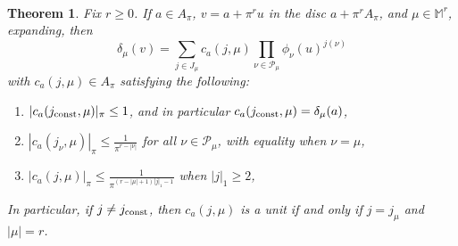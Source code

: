 \documentclass[10pt]{amsart}
\theoremstyle{Theorem}
\newtheorem{thm}{Theorem}[section]
\theoremstyle{definition}
\begin{document}
\






\begin{thm}\label{lma1} Fix $r \geq 0$. If $a \in A_{\pi}$, $v = a + \pi^r u$ in the disc $a+ \pi^r A_{\pi}$, and $\mu \in \mathbb{M}^r$, expanding, then $$\delta_{\mu}(v) = \sum_{j \in J_\mu} c_a(j,\mu) \prod_{\nu \in \mathcal{P}_\mu} \phi_\nu(u)^{j(\nu)}$$ with $c_a(j,\mu) \in A_\pi$ satisfying the following:
\begin{enumerate}
\item $|c_a(j_{\textup{const}},\mu)|_\pi \leq 1$, and in particular $c_a(j_\textup{const},\mu) = \delta_\mu(a)$,
\item $|c_a(j_{\nu},\mu)|_\pi \leq \frac{1}{\pi^{r-|\nu|}}$ for all $\nu\in\mathcal{P}_\mu$, with equality when $\nu = \mu$,
\item $|c_a(j,\mu)|_\pi \leq \frac{1}{\pi^{(r-|\mu|+1)|j|_1-1}}$ when $|j|_1\geq 2$,
\end{enumerate}
In particular, if $j\neq j_\textup{const}$, then $c_a(j,\mu)$ is a unit if and only if $j = j_\mu$ and $|\mu|= r$.
\end{thm}
\end{document}

